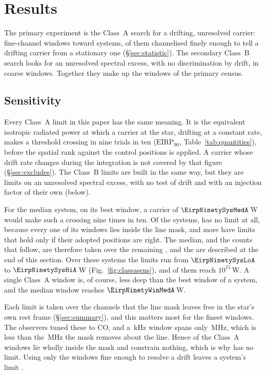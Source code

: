 \section{Results}
\label{sec:results}

The primary experiment is the Class~A search for a drifting, unresolved
carrier: \NWinA{} fine-channel windows toward \NSysClassA{} systems,
\EdrNWinA{} of them channelised finely enough to tell a drifting carrier from
a stationary one (\S\ref{sec:statistic}). The secondary Class~B search looks
for an unresolved spectral excess, with no discrimination by drift, in
\NWinB{} coarse windows. Together they make up the \NWindows{} windows of the
primary census.

\subsection{Sensitivity}
\label{sec:pninetysel}

Every Class~A limit in this paper has the same meaning. It is the
equivalent isotropic radiated power at which a carrier at the star, drifting
at a constant rate, makes a threshold crossing in nine trials in ten
($\mathrm{EIRP}_{90}$, Table~\ref{tab:quantities}), before the spatial rank
against the control positions is applied. A carrier whose drift rate
changes during the integration is not covered by that figure
(\S\ref{sec:excludes}). The Class~B limits are built in the same way, but
they are limits on an unresolved spectral excess, with no test of drift and
with an injection factor of their own (below).

For the median system, on its best window, a carrier of
$\EirpNinetySysMedA$\,W would make such a crossing nine times in ten. Of the \NSysClassA{} systems,
\NSysALostName{} has no limit at all, because every one of its windows lies
inside the line mask, and \OmNFlagWord{} more have limits that hold only if
their adopted positions are right. The median, and the counts that follow,
are therefore taken over the remaining \NSysALimSum, and the
\OmNFlagWord{} are described at the end of this section. Over these systems
the limits run from $\EirpNinetySysLoA$ to $\EirpNinetySysHiA$\,W
(Fig.~\ref{fig:classasens}), and \NSysEfifteen{} of them reach
$10^{15}$\,W. A single Class~A window is, of course, less deep than the best
window of a system, and the median window reaches
$\EirpNinetyWinMedA$\,W.

Each limit is taken over the channels that the line mask leaves free in the
star's own rest frame (\S\ref{sec:summary}), and this matters most for the
finest windows. The observers tuned these to CO, and a
\UmFineChanKHz\,kHz window spans only \UmFineBwMHz\,MHz, which is less than
the \UmFineMaskMHz\,MHz the mask removes about the line. Hence
\UmNWinAFull{} of the Class~A windows lie wholly inside the mask and
constrain nothing, which is why \NSysALostName{} has no limit. Using only the
\EdrNWinA{} windows fine enough to resolve a drift leaves a system's limit
\ScEdrMedClause.

